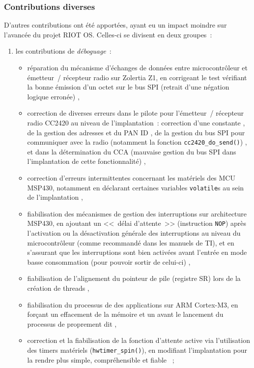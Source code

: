 \subsubsection{Contributions diverses}
\label{ParRIOTContribDiverses}

D'autres contributions ont été apportées, ayant eu un impact moindre sur
l'avancée du projet RIOT OS. Celles-ci se divisent en deux groupes~:

\begin{enumerate}

\item les contributions de \emph{déboguage}~:
\begin{itemize}
\item réparation du mécanisme d'échanges de données entre microcontrôleur et
émetteur~/ récepteur radio sur Zolertia Z1, en corrigeant le test vérifiant
la bonne émission d'un octet sur le bus SPI (retrait d'une négation logique
erronée) \cite{PRriotDebug9},
\item correction de diverses erreurs dans le pilote pour l'émetteur~/
récepteur radio CC2420 au niveau de l'implantation~: correction d'une
constante \cite{PRriotDebug3}, de la gestion des adresses et du PAN ID
\cite{PRriotDebug2}, de la gestion du bus SPI pour communiquer avec
la radio (notamment la fonction \texttt{cc2420\_do\_send()})
\cite{PRriotDebug7}, et dans la détermination du CCA (mauvaise gestion
du bus SPI dans l'implantation de cette fonctionnalité) \cite{PRriotDebug8},
\item correction d'erreurs intermittentes concernant les 
matériels des MCU MSP430, notamment en déclarant certaines variables
\texttt{volatile}s au sein de l'implantation \cite{PRriotDebug4},
\item fiabilisation des mécanismes de gestion des interruptions sur
architecture MSP430, en ajoutant un <<~délai d'attente~>> (instruction
\texttt{NOP}) après l'activation ou la désactivation générale des
interruptions au niveau du microcontrôleur (comme recommandé dans les
manuels de TI), et en s'assurant que les interruptions sont bien activées
avant l'entrée en mode basse consommation (pour pouvoir sortir de celui-ci)
\cite{PRriotDebug10},
\item fiabilisation de l'alignement du pointeur de pile (registre SR)
lors de la création de threads \cite{PRriotDebug1},
\item fiabilisation du processus de  des applications sur
ARM Cortex-M3, en forçant un effacement de la mémoire et un 
avant le lancement du processus de  proprement dit
\cite{PRriotDebug6},
\item correction et la fiabilisation de la fonction d'attente active via
l'utilisation des timers matériels (\texttt{hwtimer\_spin()}), en modifiant
l'implantation pour la rendre plus simple, compréhensible et fiable
\cite{PRriotDebug5}~;
\end{itemize}


\end{enumerate}
